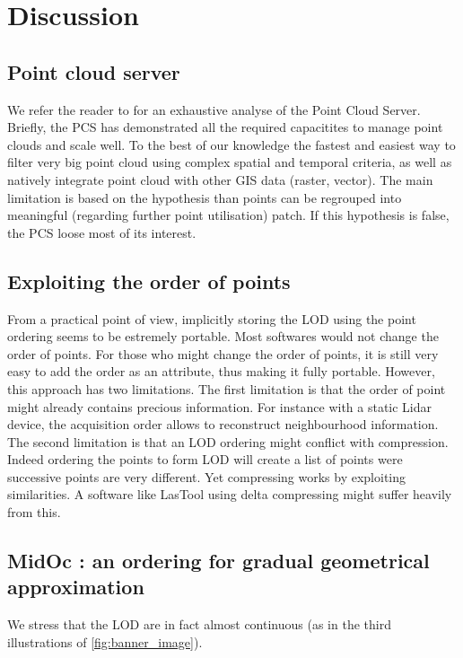 

 \section{ Discussion }
	 \label{sec:discussion} 
	 
	 \subsection{Point cloud server}
	\label{par:pointcloudserver-limitation}
	We refer the reader to \cite{Cura2014} for an exhaustive analyse of the Point Cloud Server.
	Briefly, the PCS has demonstrated all the required capacitites to manage point clouds and scale well.
	To the best of our knowledge the fastest and easiest way to filter very big point cloud using complex spatial and temporal criteria, as well as natively integrate point cloud with other GIS data (raster, vector).
	The main limitation is based on the hypothesis than points can be regrouped into meaningful (regarding further point utilisation) patch. If this hypothesis is false, the PCS loose most of its interest.
	 
		 
	\subsection{Exploiting the order of points}
	From a practical point of view, implicitly storing the LOD using the point ordering
	seems to be estremely portable. Most softwares would not change the order of points.
	For those who might change the order of points, 
	it is still very easy to add the order as an attribute, thus making it fully portable.
	However, this approach has two limitations.
	The first limitation is that the order of point might already contains precious information. 
	For instance with a static Lidar device,
	the acquisition order allows to reconstruct neighbourhood information.
	The second limitation is that an LOD ordering might conflict with compression.
	Indeed ordering the points to form LOD will create a list of points were successive points are very different. Yet compressing works by exploiting similarities.
	A software like LasTool using delta compressing might suffer heavily from this. 
			 
	 \subsection{MidOc : an ordering for gradual geometrical approximation}
	 	We stress that the LOD are in fact almost continuous (as in the third illustrations of \ref{fig:banner_image}).
		 	

